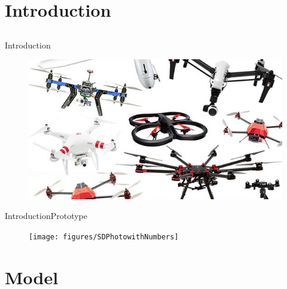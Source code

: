 \section{Introduction}

\subsection{}
\begin{frame}{Introduction}{}
\begin{figure}[H]
    \centering
    \includegraphics[width=.6\linewidth]{figures/multicopters}
\end{figure}
\end{frame}

\begin{frame}{Introduction}{Prototype}
    \begin{figure}[H]
        \centering
        \texttt{[image: figures/SDPhotowithNumbers]}
    \end{figure}
\end{frame}

\section{Model}
